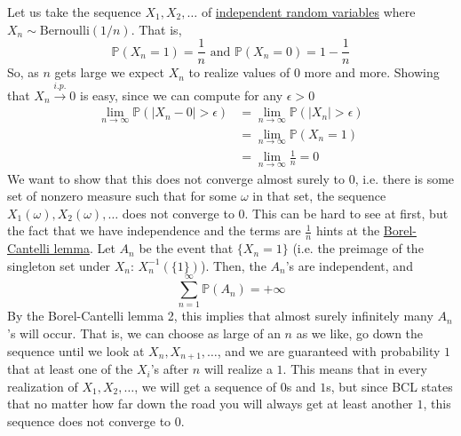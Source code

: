   \begin{example}
    \label{ex:c-in-probability-centernotimplies-c-almost-2}
    Let us take the sequence $X_1, X_2, \ldots$ of \hyperref[def:independent-random-variables]{independent random variables} where $X_n \sim \mathrm{Bernoulli}(1/n)$. That is, 
    \begin{equation}
      \mathbb{P}(X_n = 1) = \frac{1}{n} \text{ and } \mathbb{P}(X_n = 0) = 1 - \frac{1}{n}
    \end{equation}
    So, as $n$ gets large we expect $X_n$ to realize values of $0$ more and more. Showing that $X_n \xrightarrow{i.p.} 0$ is easy, since we can compute for any $\epsilon > 0$
    \begin{align*}
      \lim_{n \rightarrow \infty} \mathbb{P}(|X_n - 0| > \epsilon) & = \lim_{n \rightarrow \infty} \mathbb{P}(|X_n| > \epsilon) \\
      & = \lim_{n \rightarrow \infty} \mathbb{P}(X_n = 1) \\
      & = \lim_{n \rightarrow \infty} \frac{1}{n} = 0
    \end{align*}
    We want to show that this does not converge almost surely to $0$, i.e. there is some set of nonzero measure such that for some $\omega$ in that set, the sequence $X_1 (\omega), X_2(\omega), \ldots$ does not converge to $0$. This can be hard to see at first, but the fact that we have independence and the terms are $\frac{1}{n}$ hints at the \hyperref[mt-thm:borel-cantelli-lemma]{Borel-Cantelli lemma}. Let $A_n$ be the event that $\{X_n = 1\}$ (i.e. the preimage of the singleton set under $X_n$: $X_n^{-1} ( \{1\})$). Then, the $A_n$'s are independent, and 
    \begin{equation}
      \sum_{n=1}^\infty \mathbb{P}(A_n) = +\infty
    \end{equation}
    By the Borel-Cantelli lemma 2, this implies that almost surely infinitely many $A_n$'s will occur. That is, we can choose as large of an $n$ as we like, go down the sequence until we look at $X_n, X_{n+1}, \ldots$, and we are guaranteed with probability $1$ that at least one of the $X_i$'s after $n$ will realize a $1$. This means that in every realization of $X_1, X_2, \ldots$, we will get a sequence of $0$s and $1$s, but since BCL states that no matter how far down the road you will always get at least another $1$, this sequence does not converge to $0$.  
  \end{example}

